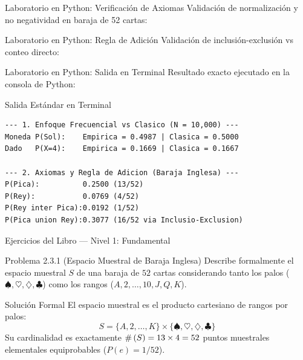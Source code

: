 \begin{frame}[fragile]{Laboratorio en Python: Verificación de Axiomas}
  Validación de normalización y no negatividad en baraja de 52 cartas:
  \vspace{0.2em}
  {
  }
\end{frame}

\begin{frame}[fragile]{Laboratorio en Python: Regla de Adición}
  Validación de inclusión-exclusión vs conteo directo:
  \vspace{0.2em}
  {
  }
\end{frame}

\begin{frame}[fragile]{Laboratorio en Python: Salida en Terminal}
  Resultado exacto ejecutado en la consola de Python:
  \vspace{0.2em}
  \begin{block}{Salida Estándar en Terminal}
    \fontsize{6.5pt}{7.5pt}\selectfont
    \begin{verbatim}
--- 1. Enfoque Frecuencial vs Clasico (N = 10,000) ---
Moneda P(Sol):    Empirica = 0.4987 | Clasica = 0.5000
Dado   P(X=4):    Empirica = 0.1669 | Clasica = 0.1667

--- 2. Axiomas y Regla de Adicion (Baraja Inglesa) ---
P(Pica):          0.2500 (13/52)
P(Rey):           0.0769 (4/52)
P(Rey inter Pica):0.0192 (1/52)
P(Pica union Rey):0.3077 (16/52 via Inclusio-Exclusion)
    \end{verbatim}
  \end{block}
\end{frame}

\begin{frame}{Ejercicios del Libro — Nivel 1: Fundamental}
  \small
  \begin{block}{Problema 2.3.1 (Espacio Muestral de Baraja Inglesa)}
    Describe formalmente el espacio muestral $S$ de una baraja de $52$ cartas considerando tanto los palos ($\spadesuit, \heartsuit, \diamondsuit, \clubsuit$) como los rangos ($A, 2, \dots, 10, J, Q, K$).
  \end{block}
  
  \vspace{0.2em}
  \pause
  \begin{alertblock}{Solución Formal}
    El espacio muestral es el producto cartesiano de rangos por palos:
    $$S = \{A, 2, \dots, K\} \times \{\spadesuit, \heartsuit, \diamondsuit, \clubsuit\}$$
    Su cardinalidad es exactamente $\#\left( S \right) = 13 \times 4 = 52$ puntos muestrales elementales equiprobables ($P(e) = 1/52$).
  \end{alertblock}
\end{frame}

